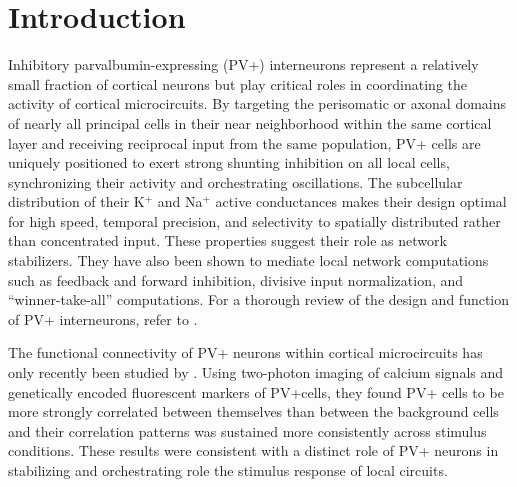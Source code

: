 \section{Introduction}
Inhibitory parvalbumin-expressing (PV+) interneurons represent a relatively small fraction of cortical neurons but play critical roles in coordinating the activity of cortical microcircuits. 
By targeting the perisomatic or axonal domains of nearly all principal cells in their near neighborhood within the same cortical layer and receiving reciprocal input from the same population, PV+ cells are uniquely positioned to exert strong shunting inhibition on all local cells, synchronizing their activity and orchestrating oscillations. 
The subcellular distribution of their K$^+$ and Na$^+$ active conductances makes their design optimal for high speed, temporal precision, and selectivity to spatially distributed rather than concentrated input. 
These properties suggest their role as network stabilizers. 
They have also been shown to mediate local network computations such as feedback and forward inhibition, divisive input normalization, and ``winner-take-all'' computations. 
For a thorough review of the design and function of PV+ interneurons, refer to \cite{Hu:2014}.

The functional connectivity of PV+ neurons within cortical microcircuits has only recently been studied by \cite{Hofer:2011}. Using two-photon imaging of calcium signals and genetically encoded fluorescent markers of PV+cells, they found PV+ cells to be more strongly correlated between themselves than between the background cells and their correlation patterns was sustained more consistently across stimulus conditions. These results were consistent with a distinct role of PV+ neurons in stabilizing and orchestrating role the stimulus response of local circuits.

